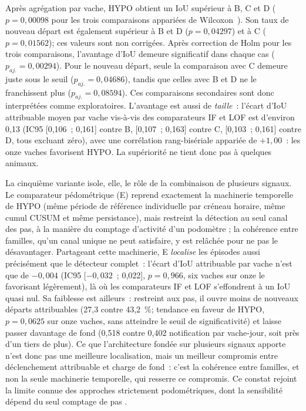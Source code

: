Après agrégation par vache, HYPO obtient un IoU supérieur à B, C et D
($p=0{,}00098$ pour les trois comparaisons appariées de Wilcoxon~\citep{wilcoxon1945individual}).
Son taux de nouveau départ est également supérieur à B et D ($p=0{,}04297$) et à C
($p=0{,}01562$); ces valeurs sont non corrigées. Après correction de Holm pour les trois
comparaisons, l'avantage d'IoU demeure significatif dans chaque cas ($p_{aj.}=0{,}00294$).
Pour le nouveau départ, seule la comparaison avec C demeure juste sous le seuil
($p_{aj.}=0{,}04686$), tandis que celles avec B et D ne le franchissent plus
($p_{aj.}=0{,}08594$). Ces comparaisons secondaires sont donc interprétées comme
exploratoires. L'avantage est aussi de
\emph{taille}~: l'écart d'IoU attribuable moyen par vache vis-à-vis des comparateurs IF et LOF
est d'environ 0,13 (IC95 [0,106~; 0,161] contre B, [0,107~; 0,163] contre C, [0,103~; 0,161]
contre D, tous excluant zéro), avec une corrélation rang-bisériale appariée
\citep{kerby2014simple} de $+1{,}00$~:
les onze vaches favorisent HYPO. La supériorité ne tient donc pas à quelques animaux.

La cinquième variante isole, elle, le rôle de la combinaison de plusieurs signaux. Le comparateur
pédométrique (E) reprend exactement la machinerie temporelle de HYPO (même période de référence
individuelle par créneau horaire, même cumul CUSUM et même persistance), mais restreint la
détection au seul canal des pas, à la manière du comptage d'activité d'un podomètre
\citep{alsaaod2012electronic}; la cohérence entre familles, qu'un canal unique ne peut
satisfaire, y est relâchée pour ne pas le désavantager. Partageant cette machinerie, E
\emph{localise} les épisodes aussi précisément que le détecteur complet~: l'écart d'IoU
attribuable par vache n'est que de $-0{,}004$ (IC95 [$-0{,}032$~; 0,022], $p=0{,}966$, six
vaches sur onze le favorisant légèrement), là où les comparateurs IF et LOF s'effondrent à
un IoU quasi nul. Sa faiblesse est ailleurs~: restreint aux pas, il ouvre moins de nouveaux
départs attribuables (27,3 contre 43,2~\%; tendance en faveur de HYPO, $p=0{,}0625$ sur onze vaches,
sans atteindre le seuil de significativité) et laisse passer davantage de fond (0,518 contre
0,402 notification par vache-jour, soit près d'un tiers de plus). Ce que l'architecture
fondée sur plusieurs signaux apporte n'est donc pas une meilleure localisation, mais un meilleur compromis
entre déclenchement attribuable et charge de fond~: c'est la cohérence entre familles, et non la seule
machinerie temporelle, qui resserre ce compromis. Ce constat rejoint la limite connue des
approches strictement podométriques, dont la sensibilité dépend du seul comptage de pas
\citep{alsaaod2012electronic,oleary2020accelerometers}.

